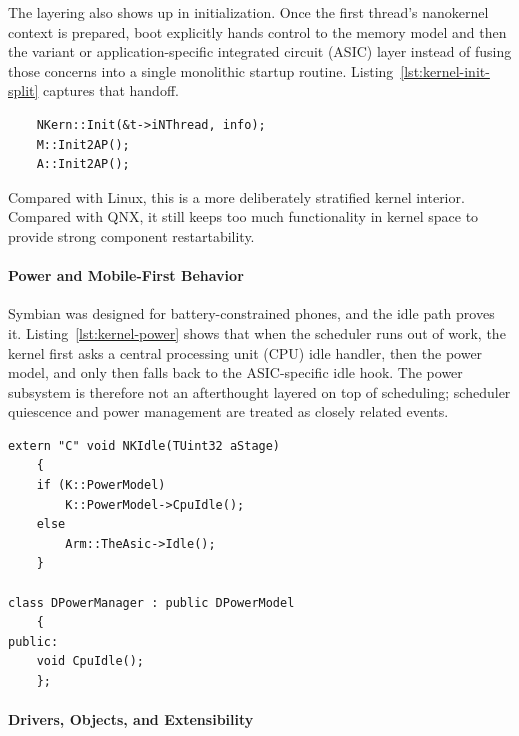 The layering also shows up in initialization. Once the first thread's
nanokernel context is prepared, boot explicitly hands control to the memory
model and then the variant or application-specific integrated circuit (ASIC)
layer instead of fusing those concerns into a single monolithic startup
routine. Listing~\ref{lst:kernel-init-split} captures that handoff.

\begin{listing}[H]
\begin{verbatim}
	NKern::Init(&t->iNThread, info);
	M::Init2AP();
	A::Init2AP();
\end{verbatim}
\caption{Boot-time handoff from nanokernel setup into the memory model and
variant layer. File: \texttt{sinit.cpp}.}
\label{lst:kernel-init-split}
\end{listing}

Compared with Linux, this is a more deliberately stratified kernel interior.
Compared with QNX, it still keeps too much functionality in kernel space to
provide strong component restartability.

\paragraph{Power and Mobile-First Behavior}

Symbian was designed for battery-constrained phones, and the idle path proves
it. Listing~\ref{lst:kernel-power} shows that when the scheduler runs out of
work, the kernel first asks a central processing unit (CPU) idle handler, then
the power model, and only then falls back to the ASIC-specific idle hook. The
power subsystem is therefore not an afterthought layered on top of scheduling;
scheduler quiescence and power management are treated as closely related
events.

\begin{listing}[H]
\begin{verbatim}
extern "C" void NKIdle(TUint32 aStage)
	{
	if (K::PowerModel)
		K::PowerModel->CpuIdle();
	else
		Arm::TheAsic->Idle();
	}

class DPowerManager : public DPowerModel
	{
public:
	void CpuIdle();
	};
\end{verbatim}
\caption{Idle handling and power-model integration. Files:
\texttt{arm/cinit.cpp} and \texttt{power.cpp}.}
\label{lst:kernel-power}
\end{listing}

\paragraph{Drivers, Objects, and Extensibility}

